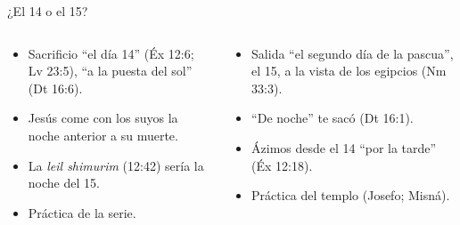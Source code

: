 \begin{frame}{¿El 14 o el 15?}
\begin{columns}[t,onlytextwidth]
\begin{column}{0.49\textwidth}
\begin{tcolorbox}[colback=papiro,colframe=mostaza!85!tierraroja,boxrule=0.8pt,arc=2pt,title={Al comenzar el 14},fonttitle=\bfseries\scriptsize,coltitle=caferojizo,colbacktitle=mostaza!35,fontupper=\scriptsize]
\begin{itemize}\scriptsize
\item Sacrificio ``el día 14'' (Éx 12:6; Lv 23:5), ``a la puesta del sol'' (Dt 16:6).
\item Jesús come con los suyos la noche anterior a su muerte.
\item La \emph{leil shimurim} (12:42) sería la noche del 15.
\item Práctica de la serie.
\end{itemize}
\end{tcolorbox}
\end{column}
\begin{column}{0.49\textwidth}
\begin{tcolorbox}[colback=papiro,colframe=mostaza!85!tierraroja,boxrule=0.8pt,arc=2pt,title={Al terminar el 14 (cena en el 15)},fonttitle=\bfseries\scriptsize,coltitle=caferojizo,colbacktitle=mostaza!35,fontupper=\scriptsize]
\begin{itemize}\scriptsize
\item Salida ``el segundo día de la pascua'', el 15, a la vista de los egipcios (Nm 33:3).
\item ``De noche'' te sacó (Dt 16:1).
\item Ázimos desde el 14 ``por la tarde'' (Éx 12:18).
\item Práctica del templo (Josefo; Misná).
\end{itemize}
\end{tcolorbox}
\end{column}
\end{columns}
\end{frame}

